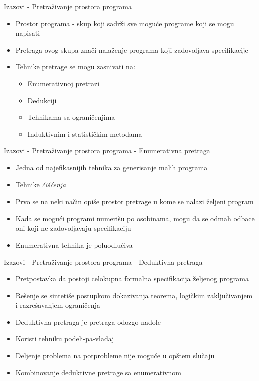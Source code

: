 \documentclass{beamer}
\begin{document}
\begin{frame}{Izazovi - Pretraživanje prostora programa}
    \begin{itemize}
        \item Prostor programa - skup koji sadrži sve moguće programe koji se mogu napisati
        \item Pretraga ovog skupa znači nalaženje programa koji zadovoljava specifikacije
        \item Tehnike pretrage se mogu zasnivati na:
            \begin{itemize}
                \item Enumerativnoj pretrazi
                \item Dedukciji
                \item Tehnikama sa ograničenjima
                \item Induktivnim i statističkim metodama
            \end{itemize}
    \end{itemize}
\end{frame}

\begin{frame}{Izazovi - Pretraživanje prostora programa - Enumerativna pretraga}
    \begin{itemize}
        \item Jedna od najefikasnijih tehnika za generisanje malih programa
        \item Tehnike \emph{čišćenja}
        \item Prvo se na neki način opiše prostor pretrage u kome se nalazi željeni program
        \item Kada se mogući programi numerišu po osobinama, mogu da se odmah odbace oni koji ne zadovoljavaju specifikaciju
        \item Enumerativna tehnika je poluodlučiva
    \end{itemize}
\end{frame}

\begin{frame}{Izazovi - Pretraživanje prostora programa - Deduktivna pretraga}
    \begin{itemize}
        \item Pretpostavka da postoji celokupna formalna specifikacija željenog programa
        \item Rešenje se sintetiše postupkom dokazivanja teorema, logičkim zaključivanjem i razrešavanjem ograničenja
        \item Deduktivna pretraga je pretraga odozgo nadole
        \item Koristi tehniku podeli-pa-vladaj
        \item Deljenje problema na potprobleme nije moguće u opštem slučaju
        \item Kombinovanje deduktivne pretrage sa enumerativnom
    \end{itemize}
\end{frame}
\end{document}
